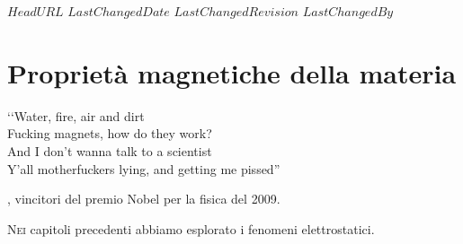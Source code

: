 \svnidlong
{$HeadURL$}
{$LastChangedDate$}
{$LastChangedRevision$}
{$LastChangedBy$}

\chapter{Proprietà magnetiche della materia}

\begin{introduction}
	‘‘Water, fire, air and dirt\\
	Fucking magnets, how do they work?\\
	And I don’t wanna talk to a scientist\\
	Y’all motherfuckers lying, and getting me pissed''
	\begin{flushright}
		, vincitori del premio Nobel per la fisica del 2009.
	\end{flushright}
\end{introduction}
\lettrine[findent=1pt, nindent=0pt]{N}{ei} capitoli precedenti abbiamo esplorato i fenomeni elettrostatici. %
